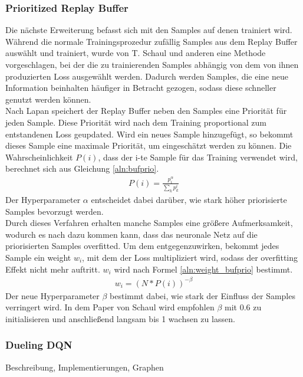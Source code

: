 \documentclass[11pt]{scrartcl}
\begin{document}
\subsubsection{Prioritized Replay Buffer} %
Die nächste Erweiterung befasst sich mit den Samples auf denen trainiert wird. Während die
normale Trainingsprozedur zufällig Samples aus dem Replay Buffer auswählt und trainiert,
wurde von T. Schaul und anderen \cite{schaul2015prioritized} eine Methode vorgeschlagen,
bei der die zu trainierenden Samples abhängig von dem von ihnen produzierten Loss
ausgewählt werden. Dadurch werden Samples, die eine neue Information beinhalten häufiger
in Betracht gezogen, sodass diese schneller genutzt werden können.\\
Nach Lapan \cite{L2018} speichert der Replay Buffer neben den Samples eine Priorität für
jeden Sample. Diese Priorität wird nach dem Training proportional zum entstandenen Loss
geupdated. Wird ein neues Sample hinzugefügt, so bekommt dieses Sample eine maximale
Priorität, um eingeschätzt werden zu können. Die Wahrscheinlichkeit $P(i)$, dass der i-te
Sample für das Training verwendet wird, berechnet sich aus Gleichung \ref{aln:bufprio}.
\begin{align}
  P(i) = \frac{p_i^\alpha}{\sum_k p_k^i}
\label{aln:bufprio}
\end{align}
\noindent
Der Hyperparameter $\alpha$ entscheidet dabei darüber, wie stark höher priorisierte
Samples bevorzugt werden.\\
Durch dieses Verfahren erhalten manche Samples eine größere Aufmerksamkeit, wodurch es
nach \cite{schaul2015prioritized} dazu kommen kann, dass das neuronale Netz auf die
priorisierten Samples overfitted. Um dem entgegenzuwirken, bekommt jedes Sample ein
weight $w_i$, mit dem der Loss multipliziert wird, sodass der overfitting Effekt nicht
mehr auftritt. $w_i$ wird nach Formel \ref{aln:weight_bufprio} bestimmt.
\begin{align}
  w_i = \left(N * P(i)\right)^{-\beta}
\label{aln:weight_bufprio}
\end{align}
\noindent
Der neue Hyperparameter $\beta$ bestimmt dabei, wie stark der Einfluss der Samples
verringert wird. In dem Paper von Schaul wird empfohlen $\beta$ mit 0.6 zu initialisieren
und anschließend langsam bis 1 wachsen zu lassen.

\subsubsection{Dueling DQN} %
Beschreibung, Implementierungen, Graphen
\end{document}
